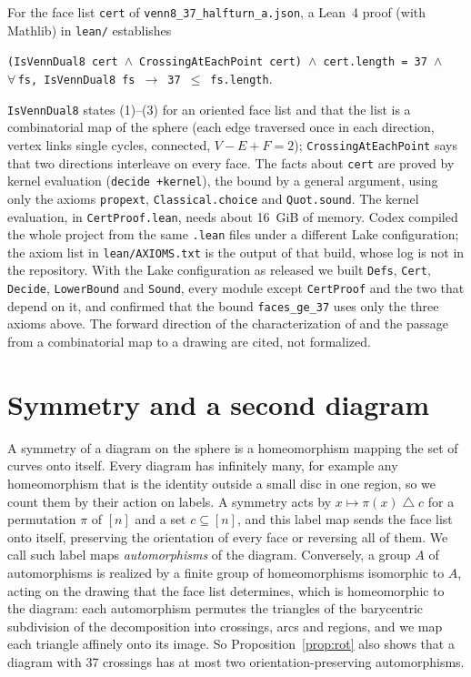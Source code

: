 \documentclass[11pt]{article}
\theoremstyle{remark}
\begin{document}
For the face list \texttt{cert} of \texttt{venn8\_37\_halfturn\_a.json}, a Lean~4 proof (with Mathlib) in
\texttt{lean/} establishes
\begin{center}\footnotesize
\texttt{(IsVennDual8 cert}\ $\wedge$\ \texttt{CrossingAtEachPoint cert)}\ $\wedge$\ \texttt{cert.length = 37}\
$\wedge$\\ $\forall$\,\texttt{fs, IsVennDual8 fs}\ $\to$\ \texttt{37}\ $\le$\ \texttt{fs.length}.
\end{center}
\texttt{IsVennDual8} states (1)--(3) for an oriented face list and that the list is a combinatorial map of the
sphere (each edge traversed once in each direction, vertex links single cycles, connected, $V-E+F=2$);
\texttt{CrossingAtEachPoint} says that two directions interleave on every face. The facts about \texttt{cert} are
proved by kernel evaluation (\texttt{decide +kernel}), the bound by a general argument, using only the axioms
\texttt{propext}, \texttt{Classical.choice} and \texttt{Quot.sound}. The kernel evaluation, in
\texttt{CertProof.lean}, needs about 16~GiB of memory. Codex compiled the whole project from the same \texttt{.lean}
files under a different Lake configuration; the axiom list in \texttt{lean/AXIOMS.txt} is the output of that build,
whose log is not in the repository. With the Lake configuration as released we built \texttt{Defs}, \texttt{Cert},
\texttt{Decide}, \texttt{LowerBound} and \texttt{Sound}, every module except \texttt{CertProof} and the two that
depend on it, and confirmed that the bound \texttt{faces\_ge\_37} uses only the three axioms above. The
forward direction of the characterization of \cite{BGMV} and the passage from a combinatorial map to a drawing are
cited, not formalized.

\section{Symmetry and a second diagram}\label{sec:sym}

A symmetry of a diagram on the sphere is a homeomorphism mapping the set of curves onto itself. Every diagram has
infinitely many, for example any homeomorphism that is the identity outside a small disc in one region, so we count
them by their action on labels. A symmetry acts by $x\mapsto\pi(x)\mathbin{\triangle}c$ for a permutation $\pi$ of
$[n]$ and a set $c\subseteq[n]$, and this label map sends the face list onto itself, preserving the orientation of
every face or reversing all of them. We call such label maps \emph{automorphisms} of the diagram. Conversely, a group
$A$ of automorphisms is realized by a finite group of homeomorphisms isomorphic to $A$, acting on the drawing that
the face list determines, which is homeomorphic to the diagram: each automorphism permutes the triangles of the
barycentric subdivision of the decomposition into crossings, arcs and regions, and we map each triangle affinely
onto its image. So Proposition~\ref{prop:rot} also shows that a diagram with 37 crossings has at most two
orientation-preserving automorphisms.
\end{document}
